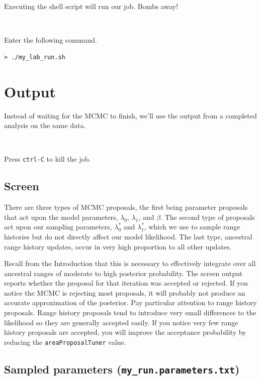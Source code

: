 \documentclass[11pt]{article}
\newcommand{\impmark}{\strut\vadjust{\domark}}
\newcommand{\domark}{%
  \vbox to 0pt{
    \kern-\dp\strutbox
    \smash{\llap{$\rightarrow$\kern1em}}
    \vss
  }%
}
\begin{document}
Executing the shell script will run our job. Bombs away!

\noindent \\ \impmark Enter the following command.
\begin{framed}
\begin{lstlisting}
> ./my_lab_run.sh
\end{lstlisting}
\end{framed}

\section{Output}

Instead of waiting for the MCMC to finish, we'll use the output from a completed analysis on the same data.

\noindent \\ \impmark Press \texttt{ctrl-C} to kill the job.

\subsection{Screen}

There are three types of MCMC proposals, the first being parameter proposals that act upon the model parameters, $\lambda_0$, $\lambda_1$, and $\beta$.
The second type of proposals act upon our sampling parameters, $\lambda^*_0$ and $\lambda^*_1$, which we use to sample range histories but do not directly affect our model likelihood.
The last type, ancestral range history updates, occur in very high proportion to all other updates.

Recall from the Introduction that this is necessary to effectively integrate over all ancestral ranges of moderate to high posterior probability.
The screen output reports whether the proposal for that iteration was accepted or rejected.
If you notice the MCMC is rejecting most proposals, it will probably not produce an accurate approximation of the posterior.
Pay particular attention to range history proposals.
Range history proposals tend to introduce very small differences to the likelihood so they are generally accepted easily.
If you notice very few range history proposals are accepted, you will improve the acceptance probability by reducing the \texttt{areaProposalTuner} value.

\subsection{Sampled parameters (\texttt{my\_run.parameters.txt})}
\end{document}

